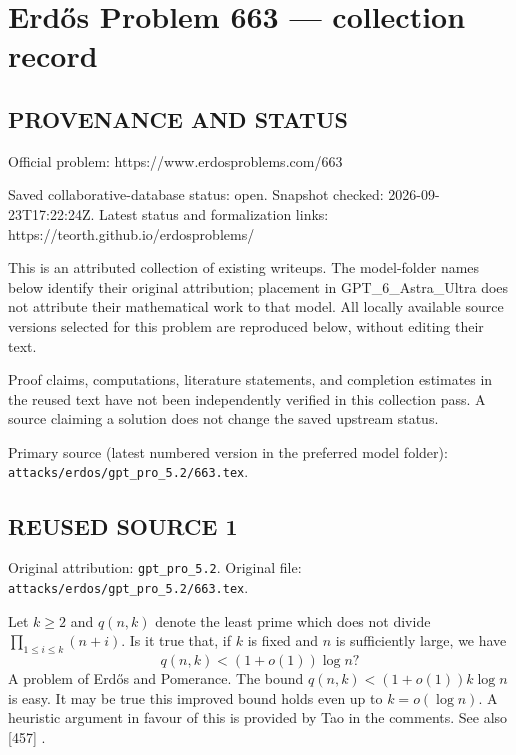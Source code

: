 \section*{Erd\H{o}s Problem 663 --- collection record}

\subsection*{PROVENANCE AND STATUS}
Official problem: https://www.erdosproblems.com/663

Saved collaborative-database status: open.
Snapshot checked: 2026-09-23T17:22:24Z.
Latest status and formalization links: https://teorth.github.io/erdosproblems/

This is an attributed collection of existing writeups. The model-folder names below identify their original attribution; placement in GPT\_6\_Astra\_Ultra does not attribute their mathematical work to that model. All locally available source versions selected for this problem are reproduced below, without editing their text.

Proof claims, computations, literature statements, and completion estimates in the reused text have not been independently verified in this collection pass. A source claiming a solution does not change the saved upstream status.

Primary source (latest numbered version in the preferred model folder): \texttt{attacks/erdos/gpt\_pro\_5.2/663.tex}.

\subsection*{REUSED SOURCE 1}
Original attribution: \texttt{gpt\_pro\_5.2}.
Original file: \texttt{attacks/erdos/gpt\_pro\_5.2/663.tex}.


Let $k\geq 2$ and $q(n,k)$ denote the least prime which does not divide $\prod_{1\leq i\leq k}(n+i)$. Is it true that, if $k$ is fixed and $n$ is sufficiently large, we have\[q(n,k)<(1+o(1))\log n?\] A problem of Erd\H{o}s and Pomerance. The bound $q(n,k)<(1+o(1))k\log n$ is easy. It may be true this improved bound holds even up to $k=o(\log n)$. A heuristic argument in favour of this is provided by Tao in the comments. See also [457] .


